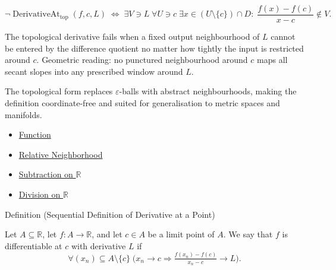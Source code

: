 \begin{remark*}
\[
\neg\operatorname{DerivativeAt}_{\mathrm{top}}(f,c,L)
\;\Longleftrightarrow\;
\exists V \ni L\;\forall U \ni c\;\exists x \in (U\setminus\{c\})\cap D:\;
\frac{f(x)-f(c)}{x-c}\notin V.
\]
\end{remark*}

\begin{remark*}
The topological derivative fails when a fixed output neighbourhood of $L$ cannot be entered by the difference quotient no matter how tightly the input is restricted around $c$. Geometric reading: no punctured neighbourhood around $c$ maps all secant slopes into any prescribed window around $L$.
\end{remark*}

\begin{remark*}[Interpretation]
The topological form replaces $\varepsilon$-balls with abstract neighbourhoods, making the definition coordinate-free and suited for generalisation to metric spaces and manifolds.
\end{remark*}

\begin{dependencies}
\begin{itemize}
  \item \hyperref[def:function]{Function}
  \item \hyperref[def:relative-neighborhood]{Relative Neighborhood}
  \item \hyperref[def:subtraction-on-r]{Subtraction on $\mathbb{R}$}
  \item \hyperref[def:division-on-r]{Division on $\mathbb{R}$}
\end{itemize}
\end{dependencies}


\begin{definitionbox}{Definition (Sequential Definition of Derivative at a Point)}
\begin{definition}
\label{def:sequential-definition-of-derivative-at-a-point}
Let $A \subseteq \mathbb{R}$, let $f : A \to \mathbb{R}$, and let $c \in A$ be a limit point of $A$. We say that $f$ is differentiable at $c$ with derivative $L$ if
\[
\forall (x_n) \subseteq A \setminus \{c\}\;
\bigl(x_n \to c \Rightarrow \tfrac{f(x_n)-f(c)}{x_n-c} \to L\bigr).
\]
\end{definition}
\end{definitionbox}

